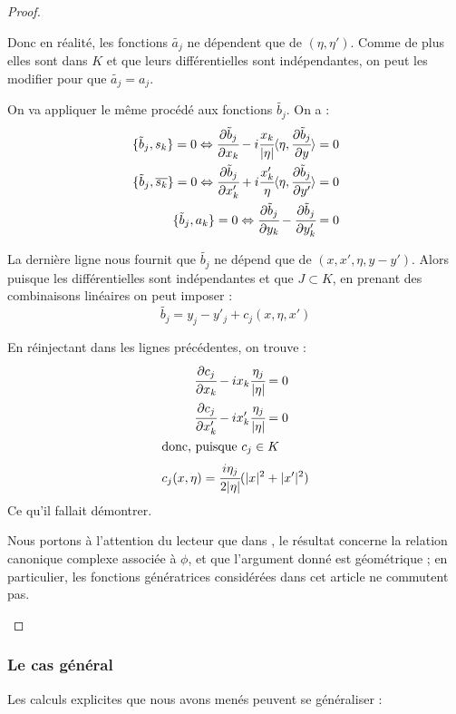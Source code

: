 \begin{proof}
\begin{enumerate}
\begin{itemize}
Donc en réalité, les fonctions $\tilde{a_j}$ ne dépendent que de $(\eta,\eta')$. Comme de plus elles sont dans $K$ et que leurs différentielles sont indépendantes, on peut les modifier pour que $\tilde{a_j}=a_j$.

On va appliquer le même procédé aux fonctions $\tilde{b_j}$. On a :
\begin{align*}
  \{\tilde{b}_j,s_k\}=0 \Leftrightarrow \cfrac{\partial \tilde{b}_j}{\partial x_k} - i \cfrac{x_k}{|\eta|}\langle \eta, \cfrac{\partial \tilde{b}_j}{\partial y} \rangle =0\\
  \{\tilde{b}_j,\overline{s_k}\}=0 \Leftrightarrow \cfrac{\partial \tilde{b}_j}{\partial x'_k} + i \cfrac{x'_k}{\eta}\langle \eta, \cfrac{\partial \tilde{b}_j}{\partial y'} \rangle =0\\
  \{\tilde{b}_j,a_k\}=0 \Leftrightarrow \cfrac{\partial \tilde{b}_j}{\partial y_k} - \cfrac{\partial \tilde{b}_j}{\partial y'_k} = 0
\end{align*}

La dernière ligne nous fournit que $\tilde{b_j}$ ne dépend que de $(x,x',\eta,y-y')$. Alors puisque les différentielles sont indépendantes et que $J \subset K$, en prenant des combinaisons linéaires on peut imposer :
\begin{equation*}
  \tilde{b_j} = y_j-y'_j + c_j(x,\eta,x')
\end{equation*}

En réinjectant dans les lignes précédentes, on trouve :
\begin{align*}
  \cfrac{\partial c_j}{\partial x_k} - i x_k\cfrac{\eta_j}{|\eta|} &=0\\
  \cfrac{\partial c_j}{\partial x'_k} - i x'_k\cfrac{\eta_j}{|\eta|} &=0\\
  \intertext{donc, puisque $c_j \in K$}
  c_j(x,\eta) = \cfrac{i\eta_j}{2|\eta|}(|x|^2 &+ |x'|^2)
\end{align*}
Ce qu'il fallait démontrer.
\end{itemize}

Nous portons à l'attention du lecteur que dans \cite{BoutetdeMonvel1975}, le résultat concerne la relation canonique complexe associée à $\phi$, et que  l'argument donné est géométrique ; en particulier, les fonctions génératrices considérées dans cet article ne commutent pas.

\end{enumerate}
\end{proof}

\subsubsection{Le cas général}
Les calculs explicites que nous avons menés peuvent se généraliser :

